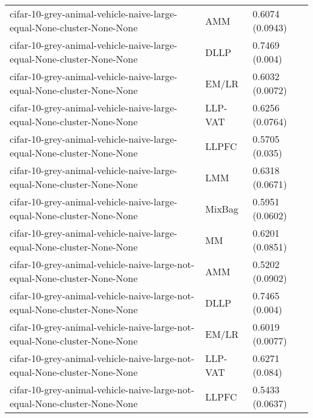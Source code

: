 \begin{longtable}{lll}
                                        cifar-10-grey-animal-vehicle-naive-large-equal-None-cluster-None-None &       AMM &                       0.6074 (0.0943) \\
                                        cifar-10-grey-animal-vehicle-naive-large-equal-None-cluster-None-None &      DLLP &                        0.7469 (0.004) \\
                                        cifar-10-grey-animal-vehicle-naive-large-equal-None-cluster-None-None &     EM/LR &                       0.6032 (0.0072) \\
                                        cifar-10-grey-animal-vehicle-naive-large-equal-None-cluster-None-None &   LLP-VAT &                       0.6256 (0.0764) \\
                                        cifar-10-grey-animal-vehicle-naive-large-equal-None-cluster-None-None &     LLPFC &                        0.5705 (0.035) \\
                                        cifar-10-grey-animal-vehicle-naive-large-equal-None-cluster-None-None &       LMM &                       0.6318 (0.0671) \\
                                        cifar-10-grey-animal-vehicle-naive-large-equal-None-cluster-None-None &    MixBag &                       0.5951 (0.0602) \\
                                        cifar-10-grey-animal-vehicle-naive-large-equal-None-cluster-None-None &        MM &                       0.6201 (0.0851) \\
                                    cifar-10-grey-animal-vehicle-naive-large-not-equal-None-cluster-None-None &       AMM &                       0.5202 (0.0902) \\
                                    cifar-10-grey-animal-vehicle-naive-large-not-equal-None-cluster-None-None &      DLLP &                        0.7465 (0.004) \\
                                    cifar-10-grey-animal-vehicle-naive-large-not-equal-None-cluster-None-None &     EM/LR &                       0.6019 (0.0077) \\
                                    cifar-10-grey-animal-vehicle-naive-large-not-equal-None-cluster-None-None &   LLP-VAT &                        0.6271 (0.084) \\
                                    cifar-10-grey-animal-vehicle-naive-large-not-equal-None-cluster-None-None &     LLPFC &                       0.5433 (0.0637) \\

\end{longtable}
